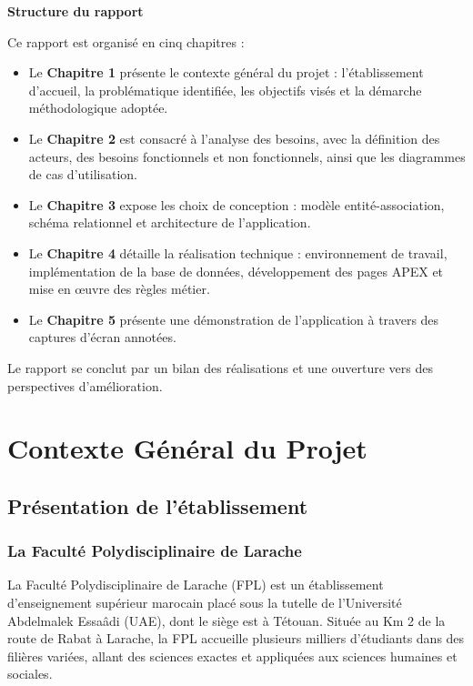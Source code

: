 \documentclass[12pt,a4paper,oneside]{report}
\begin{document}
\medskip
\textbf{Structure du rapport}

Ce rapport est organisé en cinq chapitres :

\begin{itemize}[leftmargin=2em]
  \item Le \textbf{Chapitre 1} présente le contexte général du projet : l'établissement d'accueil, la problématique identifiée, les objectifs visés et la démarche méthodologique adoptée.
  \item Le \textbf{Chapitre 2} est consacré à l'analyse des besoins, avec la définition des acteurs, des besoins fonctionnels et non fonctionnels, ainsi que les diagrammes de cas d'utilisation.
  \item Le \textbf{Chapitre 3} expose les choix de conception : modèle entité-association, schéma relationnel et architecture de l'application.
  \item Le \textbf{Chapitre 4} détaille la réalisation technique : environnement de travail, implémentation de la base de données, développement des pages APEX et mise en œuvre des règles métier.
  \item Le \textbf{Chapitre 5} présente une démonstration de l'application à travers des captures d'écran annotées.
\end{itemize}

Le rapport se conclut par un bilan des réalisations et une ouverture vers des perspectives d'amélioration.

\chapter{Contexte Général du Projet}

\section{Présentation de l'établissement}

\subsection{La Faculté Polydisciplinaire de Larache}

La Faculté Polydisciplinaire de Larache (FPL) est un établissement d'enseignement supérieur marocain placé sous la tutelle de l'Université Abdelmalek Essaâdi (UAE), dont le siège est à Tétouan. Située au Km 2 de la route de Rabat à Larache, la FPL accueille plusieurs milliers d'étudiants dans des filières variées, allant des sciences exactes et appliquées aux sciences humaines et sociales.
\end{document}
